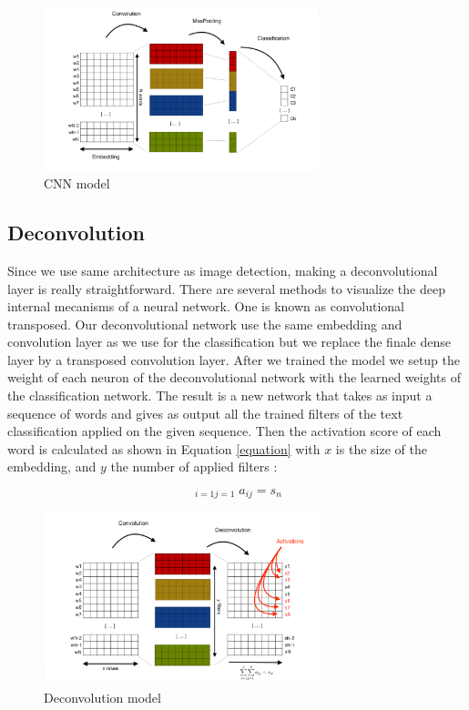 \begin{figure}[h]
\begin{center}
\includegraphics[width=8cm]{img/model_classif.png}
\caption{CNN model}
\label{cnn}
\end{center}
\end{figure}

\subsection{Deconvolution}

Since we use same architecture as image detection, making a deconvolutional layer is really straightforward. There are several methods to visualize the deep internal mecanisms of a neural network. One is known as convolutional transposed. Our deconvolutional network use the same embedding and convolution layer as we use for the classification but we replace the finale dense layer by a transposed convolution layer. After we trained the model we setup the weight of each neuron of the deconvolutional network with the learned weights of the classification network. The result is a new network that takes as input a sequence of words and gives as output all the trained filters of the text classification applied on the given sequence. Then the activation score of each word is calculated as shown in Equation \ref{equation} with $x$ is the size of the embedding, and $y$ the number of applied filters : 

\begin{equation}
\mathop{\sum^{x}\sum^{y}}_{i=1  j=1}  a_{ij} = s_{n}
\label{equation}
\end{equation}

\begin{figure}[h]
\begin{center}
\includegraphics[width=8cm]{img/model_deconv.png}
\caption{Deconvolution model}
\label{cnn}
\end{center}
\end{figure}

